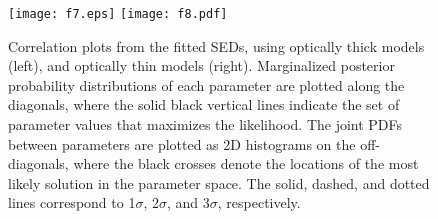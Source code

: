 \documentclass[iop, revtex4]{emulateapj}
\begin{document}
\begin{figure}[!tbph]
\centering
\hspace{-1.1cm}
\texttt{[image: f7.eps]}
\hspace{-1cm}
\texttt{[image: f8.pdf]}
\hspace{-1.1cm}
\caption{Correlation plots from the fitted SEDs, using optically thick
models (left), and optically thin models (right). Marginalized posterior probability
distributions of each
parameter are plotted along the diagonals, where the solid black vertical lines indicate the set of parameter values that maximizes the likelihood. The joint PDFs between parameters are plotted as 2D histograms on the off-diagonals, where the black crosses denote the
locations of the most likely solution in the parameter space. The solid, dashed, and dotted lines correspond to 1$\sigma$, 2$\sigma$, and $3\sigma$, respectively. 
\label{fig:sedlikelihood}}
\end{figure}
\end{document}
